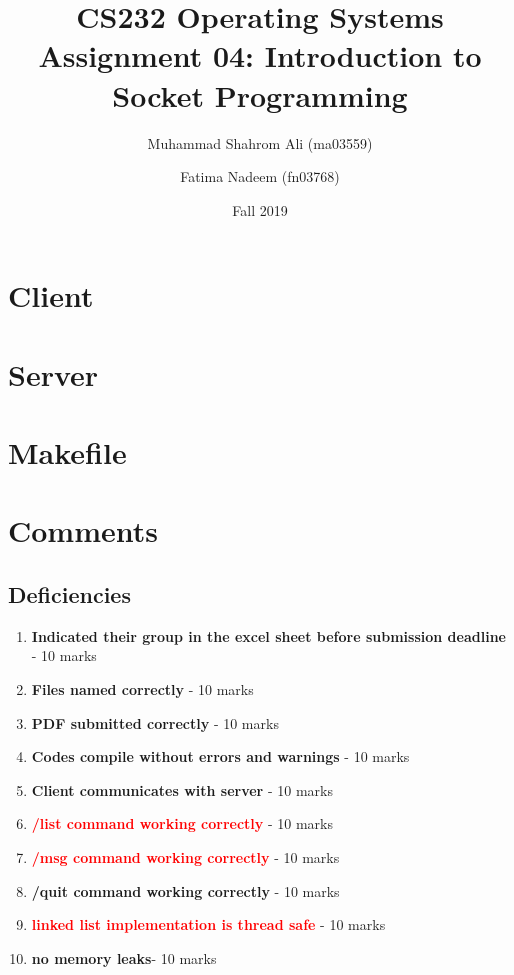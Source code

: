 \documentclass[a4paper]{article}
\newcommand\complete[1]{\textcolor{OliveGreen}{\textbf{#1}}}
\newcommand\pending[1]{\textcolor{red}{\textbf{#1}}}
\begin{document}
\title{CS232 Operating Systems \\ Assignment 04: Introduction to Socket Programming}
\author{Muhammad Shahrom Ali (ma03559) \and Fatima Nadeem (fn03768)}
\date{Fall 2019}

\maketitle


\section {Client}

\clearpage
\section {Server}

\clearpage
\section {Makefile}



\clearpage
\section {Comments}
    \subsection{Deficiencies}
        \begin{enumerate}
            \item \complete{ Indicated their group in the excel sheet before submission deadline} - 10 marks
            \item \complete{ Files named correctly} - 10 marks
            \item \complete{ PDF submitted correctly} - 10 marks
            \item \complete{ Codes compile without errors and warnings} - 10 marks
            \item \complete{ Client communicates with server} - 10 marks
            \item \pending{ /list command working correctly} - 10 marks
            \item \pending{ /msg command working correctly} - 10 marks
            \item \complete{ /quit command working correctly} - 10 marks
            \item \pending{ linked list implementation is thread safe} - 10 marks
            \item \complete{ no memory leaks}- 10 marks
        \end{enumerate}
\end{document}
